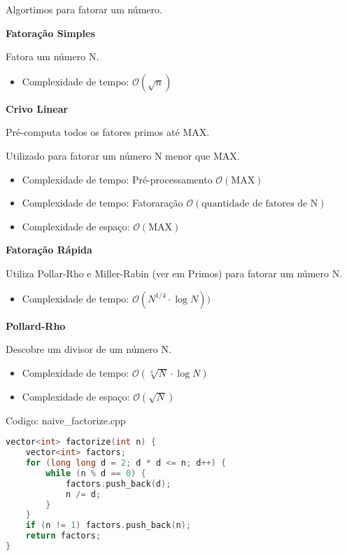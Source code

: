 \documentclass[10pt, a4paper, oneside]{book}
\begin{document}
Algortimos para fatorar um número.



\textbf{Fatoração Simples} 

Fatora um número N.



\begin{itemize}
\item Complexidade de tempo: $\mathcal{O}(\sqrt n)$
\end{itemize}



\textbf{Crivo Linear} 

Pré-computa todos os fatores primos até MAX.

Utilizado para fatorar um número N menor que MAX.



\begin{itemize}
\item Complexidade de tempo: Pré-processamento $\mathcal{O}(\text{MAX})$
\item Complexidade de tempo: Fatoraração $\mathcal{O}(\text{quantidade de fatores de N})$
\item Complexidade de espaço: $\mathcal{O}(\text{MAX})$
\end{itemize}



\textbf{Fatoração Rápida} 

Utiliza Pollar-Rho e Miller-Rabin (ver em Primos) para fatorar um número N.



\begin{itemize}
\item Complexidade de tempo: $\mathcal{O}(N^{1/4} \cdot \log N))$
\end{itemize}



\textbf{Pollard-Rho} 

Descobre um divisor de um número N.



\begin{itemize}
\item Complexidade de tempo: $\mathcal{O}(\sqrt[4]{N} \cdot \log N)$
\item Complexidade de espaço: $\mathcal{O}(\sqrt N)$
\end{itemize}

\hfill

Codigo: naive\_factorize.cpp

\begin{lstlisting}[language=C++]
vector<int> factorize(int n) {
    vector<int> factors;
    for (long long d = 2; d * d <= n; d++) {
        while (n % d == 0) {
            factors.push_back(d);
            n /= d;
        }
    }
    if (n != 1) factors.push_back(n);
    return factors;
}
\end{lstlisting}
\hfill
\end{document}
